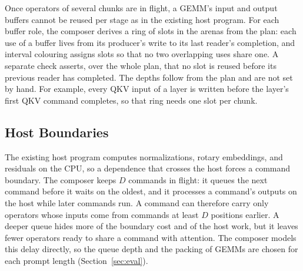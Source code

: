 Once operators of several chunks are in flight, a GEMM's input and output buffers cannot be reused per stage as in the existing host program.
For each buffer role, the composer derives a ring of slots in the arenas from the plan: each use of a buffer lives from its producer's write to its last reader's completion, and interval colouring assigns slots so that no two overlapping uses share one.
A separate check asserts, over the whole plan, that no slot is reused before its previous reader has completed.
The depths follow from the plan and are not set by hand.
For example, every QKV input of a layer is written before the layer's first QKV command completes, so that ring needs one slot per chunk.

\subsection{Host Boundaries}
\label{subsec:host}

The existing host program computes normalizations, rotary embeddings, and residuals on the CPU, so a dependence that crosses the host forces a command boundary.
The composer keeps $D$ commands in flight: it queues the next command before it waits on the oldest, and it processes a command's outputs on the host while later commands run.
A command can therefore carry only operators whose inputs come from commands at least $D$ positions earlier.
A deeper queue hides more of the boundary cost and of the host work, but it leaves fewer operators ready to share a command with attention.
The composer models this delay directly, so the queue depth and the packing of GEMMs are chosen for each prompt length (Section~\ref{sec:eval}).

